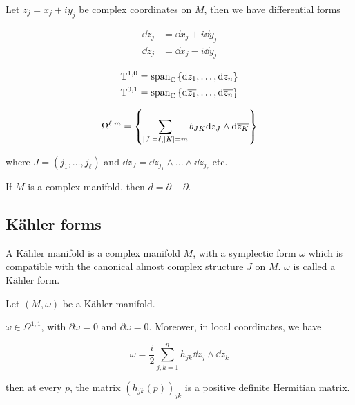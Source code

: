\begin{definition}
    Let \(z_j = x_j + iy_j\) be complex coordinates on \(M\), then we have differential forms

    \begin{align*}
        \dd z_j &= \dd x_j + i\dd y_j \\
        \dd \overline{z_j} &= \dd x_j - i\dd y_j
    \end{align*}
\end{definition}

\begin{lemma}
    \begin{align*}
        \mathrm{T}^{1, 0} = \operatorname{span}_{\mathbb{C}}\left\{\dd z_1, \dots, \dd z_n\right\} \\
        \mathrm{T}^{0, 1} = \operatorname{span}_{\mathbb{C}}\left\{\dd \overline{z_1}, \dots, \dd \overline{z_n}\right\}
    \end{align*}
\end{lemma}

\begin{proposition}
    \[\Omega^{\ell, m} = \left\{\sum_{\abs{J} = \ell, \abs{K} = m}b_{JK}\dd z_J \wedge \dd \overline{z_K}\right\}\]

    where \(J = (j_1, \dots, j_\ell)\) and \(\dd z_J = \dd z_{j_1} \wedge \dots \wedge \dd z_{j_\ell}\) etc.
\end{proposition}

\begin{proposition}
    If \(M\) is a complex manifold, then \(d = \partial + \overline\partial\).
\end{proposition}

\subsection{K\"ahler forms}

\begin{definition}
     A K\"ahler manifold is a complex manifold \(M\), with a symplectic form \(\omega\) which is compatible with the canonical almost complex structure \(J\) on \(M\). \(\omega\) is called a K\"ahler form.
\end{definition}

Let \((M, \omega)\) be a K\"ahler manifold.

\begin{proposition}
    \(\omega \in \Omega^{1, 1}\), with \(\partial \omega = 0\) and \(\overline\partial\omega = 0\). Moreover, in local coordinates, we have

    \[\omega = \frac{i}{2}\sum_{j, k = 1}^n h_{jk}\dd z_j \wedge \dd\overline{z_k}\]

    then at every \(p\), the matrix \((h_{jk}(p))_{jk}\) is a positive definite Hermitian matrix.
\end{proposition}

